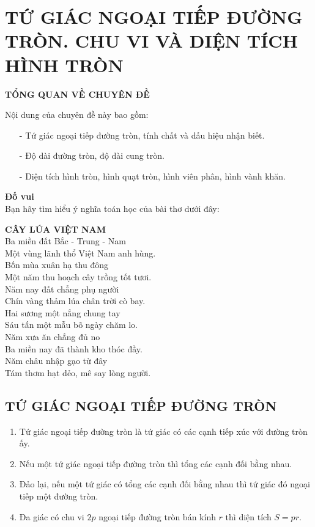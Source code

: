 \section{TỨ GIÁC NGOẠI TIẾP ĐƯỜNG TRÒN. CHU VI VÀ DIỆN TÍCH HÌNH TRÒN}

\begin{center}
\large \textbf{TỔNG QUAN VỀ CHUYÊN ĐỀ}
\end{center}
Nội dung của chuyên đề này bao gồm:
\begin{itemize}
\item[-] Tứ giác ngoại tiếp đường tròn, tính chất và dấu hiệu nhận biết.
\item[-] Độ dài đường tròn, độ dài cung tròn.
\item[-] Diện tích hình tròn, hình quạt tròn, hình viên phân, hình vành khăn.
\end{itemize}


\noindent
\textbf{Đố vui}\\
Bạn hãy tìm hiểu ý nghĩa toán học của bài thơ dưới đây:
\begin{center}
{\bf CÂY LÚA VIỆT NAM}\\
Ba miền đất Bắc - Trung - Nam\\
Một vùng lãnh thổ Việt Nam anh hùng.\\
Bốn mùa xuân hạ thu đông\\
Một năm thu hoạch cây trồng tốt tươi.\\
Năm nay đất chẳng phụ người\\
Chín vàng thảm lúa chân trời cò bay.\\
Hai sương một nắng chung tay\\
Sáu tấn một mẫu bõ ngày chăm lo.\\
Năm xưa ăn chẳng đủ no\\
Ba miền nay đã thành kho thóc đầy.\\
Năm châu nhập gạo từ đây\\
Tám thơm hạt dẻo, mê say lòng người.
\end{center}

\subsection{TỨ GIÁC NGOẠI TIẾP ĐƯỜNG TRÒN}

\begin{enumerate}
\item Tứ giác ngoại tiếp đường tròn là tứ giác có các cạnh tiếp xúc với đường tròn ấy.
\item Nếu một tứ giác ngoại tiếp đường tròn thì tổng các cạnh đối bằng nhau.
\item Đảo lại, nếu một tứ giác có tổng các cạnh đối bằng nhau thì tứ giác đó ngoại tiếp một đường tròn.
\item Đa giác có chu vi $2p$ ngoại tiếp đường tròn bán kính $r$ thì diện tích $S=pr$.
\end{enumerate}

